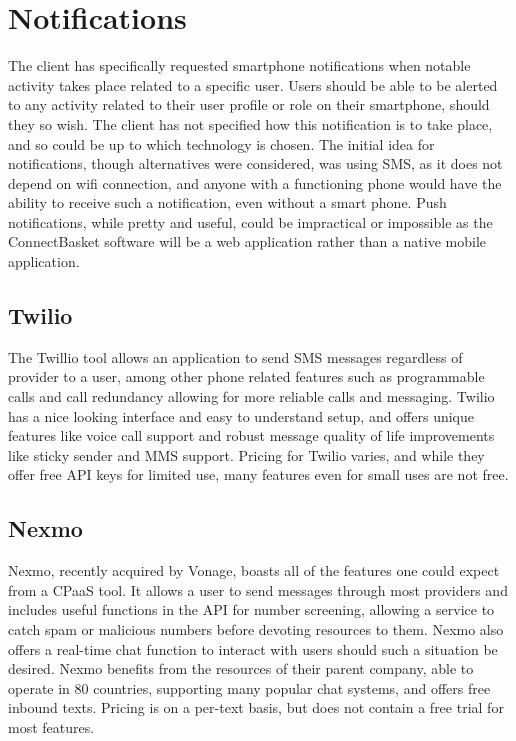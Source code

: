 \documentclass[onecolumn, draftclsnofoot,10pt, compsoc]{IEEEtran}
\begin{document}

\section{Notifications}
The client has specifically requested smartphone notifications when notable activity takes place related to a specific user. Users should be able to be alerted to any activity 
related to their user profile or role on their smartphone, should they so wish. The client has not specified how this notification is to take place, and so could be up to which technology 
is chosen. The initial idea for notifications, though alternatives were considered, was using SMS, as it does not depend on wifi connection, and anyone with a functioning phone would 
have the ability to receive such a notification, even without a smart phone. Push notifications, while pretty and useful, could be impractical or impossible as the ConnectBasket software 
will be a web application rather than a native mobile application.
\subsection{Twilio}
The Twillio tool allows an application to send SMS messages regardless of provider to a user, among other phone related features such as programmable calls and call redundancy allowing
for more reliable calls and messaging. Twilio has a nice looking interface and easy to understand setup, and offers unique features like voice call support and robust 
message quality of life improvements like sticky sender and MMS support. Pricing for Twilio varies, and while they offer free API keys for limited use, many features even for small uses 
are not free.
\subsection{Nexmo}
Nexmo, recently acquired by Vonage, boasts all of the features one could expect from a CPaaS tool. It allows a user to send messages through most providers and includes useful functions in
the API for number screening, allowing a service to catch spam or malicious numbers before devoting resources to them. Nexmo also offers a real-time chat function to interact with users 
should such a situation be desired. Nexmo benefits from the resources of their parent company, able to operate in 80 countries, supporting many popular chat systems, and offers free inbound texts.
Pricing is on a per-text basis, but does not contain a free trial for most features.
\end{document}
